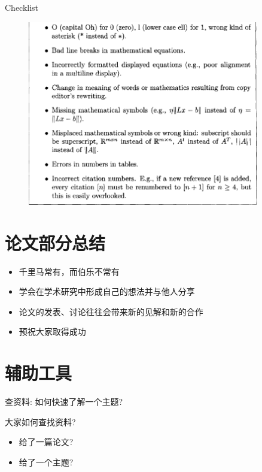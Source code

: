 \documentclass[UTF8]{ctexbeamer}
\begin{document}
\begin{frame}{Checklist}
    \begin{figure}
        \centering
        \includegraphics[width=0.9\textwidth]{figure/Figure 8.2.2.png}
        \label{fig:my_label}
    \end{figure}
\end{frame}


\section{论文部分总结}
\begin{frame}
    \begin{itemize}
        \item 千里马常有，而伯乐不常有
        \item 学会在学术研究中形成自己的想法并与他人分享
        \item 论文的发表、讨论往往会带来新的见解和新的合作
        \item 预祝大家取得成功
    \end{itemize}
\end{frame}

\section{辅助工具}
\begin{frame}{查资料: 如何快速了解一个主题?}
\begin{alertblock}{大家如何查找资料?}
    \begin{itemize}
        \item 给了一篇论文?
        \item 给了一个主题?
    \end{itemize}
\end{alertblock}
\end{frame}
\end{document}
